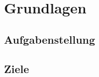 \section{Grundlagen}
\label{sec:Grundlagen}


\subsection{Aufgabenstellung}
\label{subsec:Aufgabenstellung}


\subsection{Ziele}
\label{subsec:Ziele}


